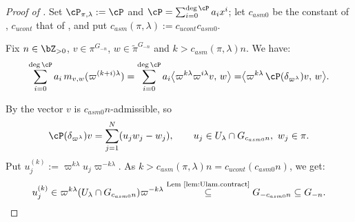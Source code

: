 \documentclass[12pt,a4paper]{amsart}%
\newcommand{\RamiA}[1]{{{#1}}}
\begin{document}
\begin{proof}[Proof of ]
Set $\cP_{\pi,\lambda}:=\cP$  and $\cP=\sum_{i=0}^{\deg\cP}a_ix^i$; let $c_{asm0}$ be the constant of , $c_{ucont}$ that of , and put $c_{asm}(\pi,\lambda):=c_{ucont}c_{asm0}$.

Fix $n\in\Z_{>0}$, $v\in\pi^{G_{-n}}$, $w\in\tilde\pi^{G_{-n}}$ and $k>c_{asm}(\pi,\lambda)n$. %
\RamiA{We have:}
\begin{equation}\label{eq:mc.P}
\sum_{i=0}^{\deg\cP}a_i\,m_{v,w}(\varpi^{(k+i)\lambda})
=\RamiA{\sum_{i=0}^{\deg\cP}a_i\big\langle\varpi^{k\lambda}\varpi^{i\lambda}v,\,w\big\rangle
=}\big\langle\varpi^{k\lambda}\,\cP(\delta_{\varpi^\lambda})v,\,w\big\rangle .
\end{equation}

By  the vector $v$ is $c_{asm0}n$-admissible, so
\begin{equation}\label{eq:P.unip}
\cP(\delta_{\varpi^\lambda})v=\sum_{j=1}^{N}(u_jw_j-w_j),\qquad u_j\in U_\lambda\cap G_{c_{asm0}n},\ w_j\in\pi.
\end{equation}
Put $u_j^{(k)}:=\varpi^{k\lambda}u_j\varpi^{-k\lambda}$. As $k>c_{asm}(\pi,\lambda)n=c_{ucont}(c_{asm0}n)$, 
\RamiA{we get:}
\begin{equation}\label{eq:G-n}    
u_j^{(k)}\in\varpi^{k\lambda}(U_\lambda\cap G_{c_{asm0}n})\varpi^{-k\lambda}\overset{\text{Lem \ref{lem:Ulam.contract}}}{\subseteq} G_{-c_{asm0}n}\subseteq G_{-n}.
\end{equation}


\end{proof}
\end{document}
